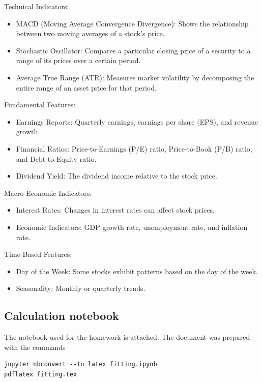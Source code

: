 \documentclass{article}
\begin{document}
Technical Indicators:

\begin{itemize}
    \item MACD (Moving Average Convergence Divergence): Shows the relationship between two moving averages of a stock’s price.
    \item Stochastic Oscillator: Compares a particular closing price of a security to a range of its prices over a certain period.
    \item Average True Range (ATR): Measures market volatility by decomposing the entire range of an asset price for that period.
\end{itemize}

Fundamental Features:

\begin{itemize}
    \item Earnings Reports: Quarterly earnings, earnings per share (EPS), and revenue growth.
    \item Financial Ratios: Price-to-Earnings (P/E) ratio, Price-to-Book (P/B) ratio, and Debt-to-Equity ratio.
    \item Dividend Yield: The dividend income relative to the stock price.
\end{itemize}

Macro-Economic Indicators:

\begin{itemize}
    \item Interest Rates: Changes in interest rates can affect stock prices.
    \item Economic Indicators: GDP growth rate, unemployment rate, and inflation rate.
\end{itemize}

Time-Based Features:

\begin{itemize}
    \item Day of the Week: Some stocks exhibit patterns based on the day of the week.
    \item Seasonality: Monthly or quarterly trends.
\end{itemize}

\subsection{Calculation notebook}
The notebook used for the homework is attached.
The document was prepared with the commands
\begin{verbatim}
jupyter nbconvert --to latex fitting.ipynb
pdflatex fitting.tex
\end{verbatim}


\end{document}
